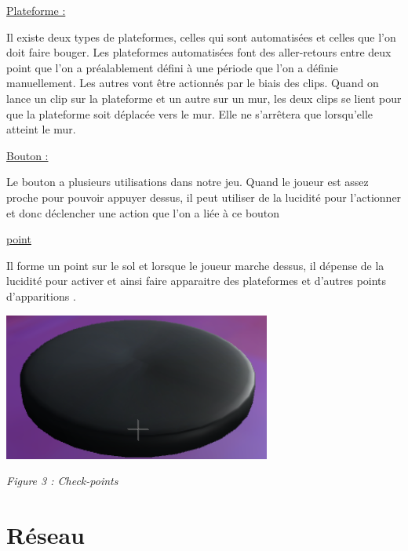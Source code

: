 \documentclass[a4paper , 12pt]{article}
\begin{document}
\quad


\newpage

	\underline{Plateforme : }

	\quad

Il existe deux types de plateformes, celles qui sont automatisées et celles que l’on doit faire bouger. Les plateformes automatisées font des aller-retours entre deux point que l’on a préalablement défini à une période que l’on a définie manuellement. Les autres vont être actionnés par le biais des clips. Quand on lance un clip sur la plateforme et un autre sur un mur, les deux clips se lient pour que la plateforme soit déplacée vers le mur. Elle ne s’arrêtera que lorsqu'elle atteint le mur.

\quad

	\underline{Bouton : }
	
	\quad

Le bouton a plusieurs utilisations dans notre jeu. Quand le joueur est assez proche pour pouvoir appuyer dessus, il peut utiliser de la lucidité pour l'actionner et donc déclencher une action que l’on a liée à ce bouton

\quad

	\underline{point}

\quad

Il forme un point sur le sol et lorsque le joueur marche dessus, il dépense de la lucidité pour activer et ainsi faire apparaitre des plateformes et d’autres points d’apparitions .

\quad

\quad

\quad


\begin{centering}

\includegraphics[scale = 1]{Check.png}

\textit{Figure 3 : Check-points}

\end{centering}

\newpage

\section{Réseau}
\end{document}
